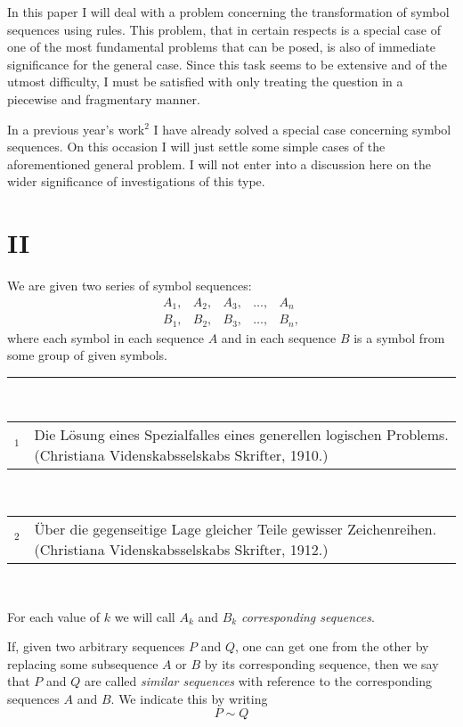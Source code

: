 In this paper I will deal with a problem concerning the transformation
of symbol sequences using rules.  This problem, that in certain respects is a
special case of one of the most fundamental problems that can be
posed, is also of immediate significance for the general case.
Since this task seems to be extensive and of the utmost difficulty,
I must be satisfied with only treating the question in a piecewise and
fragmentary manner.

In a previous year's work${}^2$ I have already solved a special case
concerning symbol sequences.  On this occasion I will just settle some
simple cases of the aforementioned general problem.  I will not enter
into a discussion here on the wider significance of investigations of
this type.

\section{II}


We are given two series of symbol sequences:
$$\begin{array}{ccccc}
A_1,& A_2,& A_3,& \ldots,& A_n\\
B_1,& B_2,& B_3,& \ldots,& B_n,
\end{array}$$
where each symbol in each sequence $A$ and in each sequence $B$ is a
symbol from some group of given symbols.


\vfill

\rule{.3\textwidth}{.5pt}\\[1ex]
{\footnotesize\begin{tabular}{lp{}}
${}^1$ &Die L\"osung eines
  Spezialfalles eines generellen logischen Problems.  (Christiana
  Videnskabsselskabs Skrifter, 1910.)
\end{tabular}}\\
{\footnotesize\begin{tabular}{lp{}}
${}^2$ & \"Uber die
  gegenseitige Lage gleicher Teile gewisser Zeichenreihen.  (Christiana
  Videnskabsselskabs Skrifter, 1912.)
\end{tabular}}\\


For each value of $k$ we will call $A_k$ and $B_k$ \emph{corresponding
 sequences}.

If, given two arbitrary sequences $P$ and $Q$, one can get one from
the other by replacing some subsequence $A$ or $B$ by its
corresponding sequence, then we say that $P$ and $Q$ are called
\emph{similar sequences} with reference to the corresponding sequences
$A$ and $B$.  We indicate this by writing 
$$P \sim Q$$

